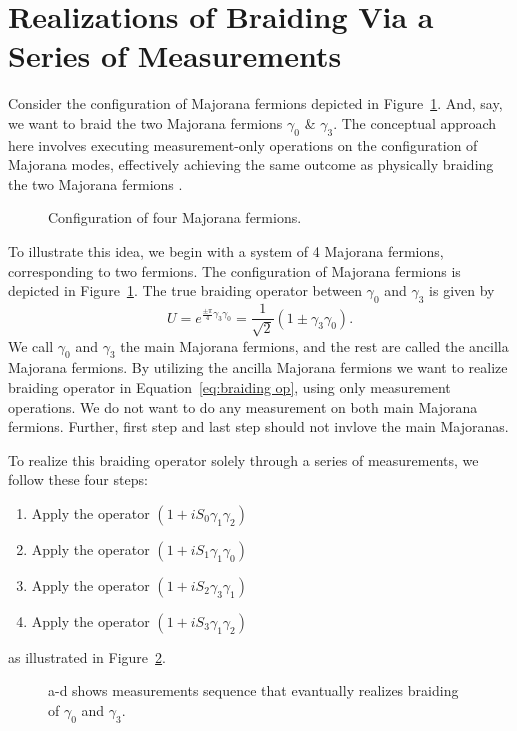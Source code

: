 \documentclass{article}
\begin{document}
\section{Realizations of Braiding Via a Series of Measurements} %
\label{sec:Realizations of Braiding Via a Series of Measurements}
Consider the configuration of Majorana fermions depicted in Figure~\ref{fig:4 mf conf}. And, say, we want to braid the two Majorana fermions $ \gamma_0 $ \& $ \gamma_3 $. The conceptual approach here involves executing measurement-only operations on the configuration of Majorana modes, effectively achieving the same outcome as physically braiding the two Majorana fermions \cite{Leijnse_2012}.
\begin{figure}
	\begin{center}
		
	\end{center}
	\caption{Configuration of four Majorana fermions.}
	\label{fig:4 mf conf}
\end{figure}
To illustrate this idea, we begin with a system of 4 Majorana fermions, corresponding to two fermions. The configuration of Majorana fermions is depicted in Figure~\ref{fig:4 mf conf}. The true braiding operator between $\gamma_0$ and $\gamma_3$ is given by
\begin{equation}
	U = e^{\frac{\pm \pi}{4} \gamma_3 \gamma_0} = \frac{1}{\sqrt{2}} (1 \pm \gamma_3 \gamma_0).
	\label{eq:braiding op}
\end{equation}
We call $ \gamma_0 $ and $ \gamma_3 $ the main Majorana fermions, and the rest are called the ancilla Majorana fermions. By utilizing the ancilla Majorana fermions we want to realize braiding operator in Equation~\ref{eq:braiding op}, using only measurement operations. We do not want to do any measurement on both main Majorana fermions. Further, first step and last step should not invlove the main Majoranas.

To realize this braiding operator solely through a series of measurements, we follow these four steps:
\begin{enumerate}
	\item Apply the operator $ (1 + iS_0 \gamma_1 \gamma_2) $
	\item Apply the operator $ (1 + iS_1 \gamma_1 \gamma_0) $
	\item Apply the operator $ (1 + iS_2 \gamma_3 \gamma_1) $
	\item Apply the operator $ (1 + iS_3 \gamma_1 \gamma_2) $
\end{enumerate}
as illustrated in Figure~\ref{fig:meas 4 mfs}.
\begin{figure}
	\begin{center}
		
	\end{center}
	\caption{a-d shows measurements sequence that evantually realizes braiding of $ \gamma_0 $ and $ \gamma_3 $.}
	\label{fig:meas 4 mfs}
\end{figure}
\end{document}
